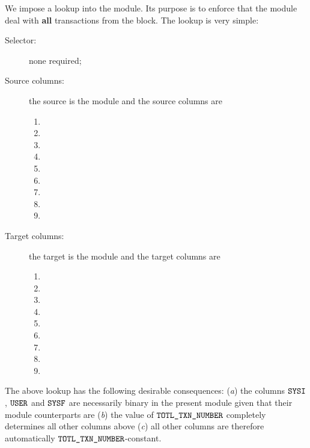 We impose a lookup into the \hubMod{} module. Its purpose is to enforce that the \hubMod{} module deal with \textbf{all} transactions from the block. The lookup is very simple:
\begin{description}
	\item[Selector:] none required;
	\item[Source columns:]
		the source is the \userTxnDataMod{} module and the source columns are
		\begin{multicols}{3}
			\begin{enumerate}
				\item \blockNumber
				\item \totalTransactionNumber
				\item[\vspace{\fill}]
				\item \sysiTransactionNumber
				\item \userTransactionNumber
				\item \sysfTransactionNumber
				\item \sysi
				\item \user
				\item \sysf
			\end{enumerate}
		\end{multicols}
	\item[Target columns:]
		the target is the \hubMod{} module and the target columns are
		\begin{multicols}{3}
			\begin{enumerate}
				\item \blockNumber
				\item \totalTransactionNumber
				\item[\vspace{\fill}]
				\item \sysiTransactionNumber
				\item \userTransactionNumber
				\item \sysfTransactionNumber
				\item \sysi
				\item \user
				\item \sysf
			\end{enumerate}
		\end{multicols}
\end{description}
\saNote{} \label{user txn data: lookups: into hub: purpose and consequences}
The above lookup has the following desirable consequences:
(\emph{a}) the columns $\texttt{SYSI}$, $\texttt{USER}$ and $\texttt{SYSF}$ are necessarily binary in the present \userTxnDataMod{} module given that their \hubMod{} module counterparts are
(\emph{b}) the value of $\texttt{TOTL}\texttt{\_}\texttt{TXN\_NUMBER}$ completely determines all other columns above
(\emph{c}) all other columns are therefore automatically $\texttt{TOTL}\texttt{\_}\texttt{TXN\_NUMBER}$-constant.
